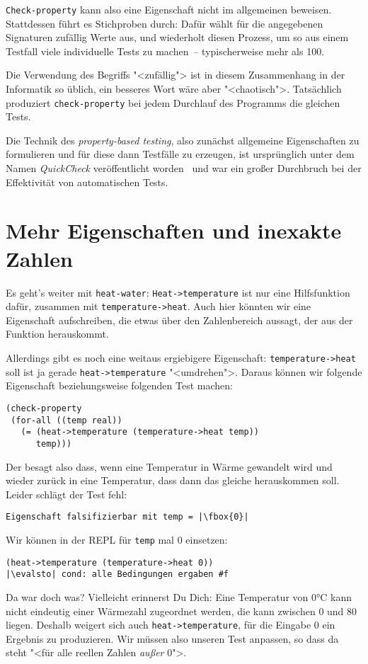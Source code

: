 \lstinline{Check-property} kann also eine Eigenschaft nicht im
allgemeinen beweisen.  Stattdessen führt es Stichproben durch: Dafür
wählt für die angegebenen Signaturen zufällig Werte aus, und
wiederholt diesen Prozess, um so aus einem Testfall viele individuelle
Tests zu machen~-- typischerweise mehr als 100.

Die Verwendung des Begriffs "<zufällig"> ist in diesem Zusammenhang in
der Informatik so üblich, ein besseres Wort wäre aber "<chaotisch">.
Tatsächlich produziert \lstinline{check-property} bei jedem Durchlauf
des Programms die gleichen Tests.

Die Technik des \textit{property-based testing}, also zunächst
allgemeine Eigenschaften zu formulieren und für diese dann Testfälle
zu erzeugen, ist ursprünglich unter dem Namen \textit{QuickCheck}
veröffentlicht worden~\cite{ClaessenHughes2000} und war ein
großer Durchbruch bei der Effektivität von automatischen Tests.

\section{Mehr Eigenschaften und inexakte Zahlen}
\label{sec:inexakt}

Es geht's weiter mit \lstinline{heat-water}:
\lstinline{Heat->temperature} ist nur eine Hilfsfunktion dafür,
zusammen mit \lstinline{temperature->heat}.  Auch hier könnten wir
eine Eigenschaft aufschreiben, die etwas über den Zahlenbereich
aussagt, der aus der Funktion herauskommt.

Allerdings gibt es noch eine weitaus ergiebigere Eigenschaft:
\lstinline{temperature->heat} soll ist ja gerade
\lstinline{heat->temperature} "<umdrehen">.  Daraus können wir
folgende Eigenschaft beziehungsweise folgenden Test machen:
%
\begin{lstlisting}
(check-property
 (for-all ((temp real))
   (= (heat->temperature (temperature->heat temp))
      temp)))
\end{lstlisting}
%
Der besagt also dass, wenn eine Temperatur in Wärme gewandelt wird und
wieder zurück in eine Temperatur, dass dann das gleiche herauskommen
soll.  Leider schlägt der Test fehl:
%
\begin{lstlisting}
Eigenschaft falsifizierbar mit temp = |\fbox{0}|
\end{lstlisting}
%
Wir können in der REPL für \lstinline{temp} mal 0 einsetzen:
%
\begin{lstlisting}
(heat->temperature (temperature->heat 0))
|\evalsto| cond: alle Bedingungen ergaben #f
\end{lstlisting}
%
Da war doch was?  Vielleicht erinnerst Du Dich: Eine Temperatur von
0\si{\degree}C kann nicht eindeutig einer Wärmezahl zugeordnet werden,
die kann zwischen 0 und 80 liegen.  Deshalb weigert sich auch
\lstinline{heat->temperature}, für die Eingabe 0 ein Ergebnis zu
produzieren.  Wir müssen also unseren Test anpassen, so dass da steht
"<für alle reellen Zahlen \emph{außer} 0">.


